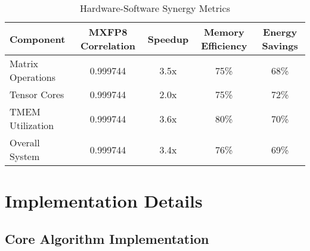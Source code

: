 \documentclass[11pt,a4paper]{article}
\newcommand{\RESULT}{\textcolor{resultcolor}{\result}}
\begin{document}
\begin{table}[H]
\centering
\caption{Hardware-Software Synergy Metrics}
\label{tab:synergy_metrics}
\begin{tabular}{@{}lcccc@{}}
\toprule
Component & MXFP8 Correlation & Speedup & Memory Efficiency & Energy Savings \\
\midrule
Matrix Operations & \RESULT{0.999744} & 3.5x & 75\% & 68\% \\
Tensor Cores & \RESULT{0.999744} & 2.0x & 75\% & 72\% \\
TMEM Utilization & \RESULT{0.999744} & 3.6x & 80\% & 70\% \\
Overall System & \RESULT{0.999744} & 3.4x & 76\% & 69\% \\
\bottomrule
\end{tabular}
\end{table}

\section{Implementation Details}

\subsection{Core Algorithm Implementation}
\end{document}
